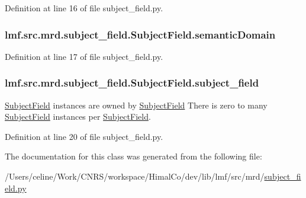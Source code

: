 Definition at line 16 of file subject\+\_\+field.\+py.

\hypertarget{classlmf_1_1src_1_1mrd_1_1subject__field_1_1_subject_field_aa625fa1b644690d878091eaa4ea9460f}{
\subsubsection[{semantic\+Domain}]{\setlength{\rightskip}{0pt plus 5cm}lmf.\+src.\+mrd.\+subject\+\_\+field.\+Subject\+Field.\+semantic\+Domain}}\label{classlmf_1_1src_1_1mrd_1_1subject__field_1_1_subject_field_aa625fa1b644690d878091eaa4ea9460f}


Definition at line 17 of file subject\+\_\+field.\+py.

\hypertarget{classlmf_1_1src_1_1mrd_1_1subject__field_1_1_subject_field_ae43454d43d98b42b780661e8b18f89d4}{
\subsubsection[{subject\+\_\+field}]{\setlength{\rightskip}{0pt plus 5cm}lmf.\+src.\+mrd.\+subject\+\_\+field.\+Subject\+Field.\+subject\+\_\+field}}\label{classlmf_1_1src_1_1mrd_1_1subject__field_1_1_subject_field_ae43454d43d98b42b780661e8b18f89d4}


\hyperlink{classlmf_1_1src_1_1mrd_1_1subject__field_1_1_subject_field}{Subject\+Field} instances are owned by \hyperlink{classlmf_1_1src_1_1mrd_1_1subject__field_1_1_subject_field}{Subject\+Field} There is zero to many \hyperlink{classlmf_1_1src_1_1mrd_1_1subject__field_1_1_subject_field}{Subject\+Field} instances per \hyperlink{classlmf_1_1src_1_1mrd_1_1subject__field_1_1_subject_field}{Subject\+Field}. 



Definition at line 20 of file subject\+\_\+field.\+py.



The documentation for this class was generated from the following file\+:\begin{DoxyCompactItemize}
\item 
/\+Users/celine/\+Work/\+C\+N\+R\+S/workspace/\+Himal\+Co/dev/lib/lmf/src/mrd/\hyperlink{subject__field_8py}{subject\+\_\+field.\+py}\end{DoxyCompactItemize}
